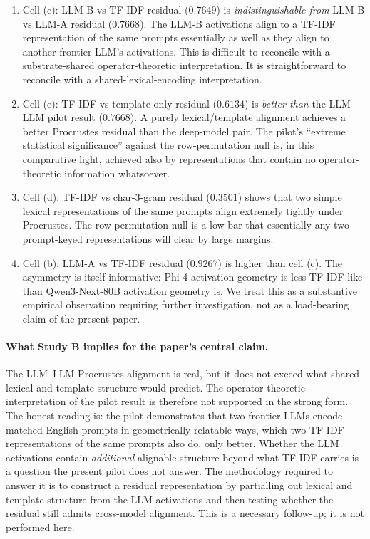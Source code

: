 \begin{enumerate}
    \item Cell (c): LLM-B vs TF-IDF residual ($0.7649$) is
        \emph{indistinguishable from} LLM-B vs LLM-A residual
        ($0.7668$). The LLM-B activations align to a TF-IDF
        representation of the same prompts essentially as well as
        they align to another frontier LLM's activations. This is
        difficult to reconcile with a substrate-shared
        operator-theoretic interpretation. It is straightforward to
        reconcile with a shared-lexical-encoding interpretation.
    \item Cell (e): TF-IDF vs template-only residual ($0.6134$) is
        \emph{better than} the LLM--LLM pilot result ($0.7668$). A
        purely lexical/template alignment achieves a better
        Procrustes residual than the deep-model pair. The pilot's
        ``extreme statistical significance'' against the
        row-permutation null is, in this comparative light, achieved
        also by representations that contain no
        operator-theoretic information whatsoever.
    \item Cell (d): TF-IDF vs char-3-gram residual ($0.3501$) shows
        that two simple lexical representations of the same prompts
        align extremely tightly under Procrustes. The
        row-permutation null is a low bar that essentially any two
        prompt-keyed representations will clear by large margins.
    \item Cell (b): LLM-A vs TF-IDF residual ($0.9267$) is higher than
        cell (c). The asymmetry is itself informative: Phi-4
        activation geometry is less TF-IDF-like than Qwen3-Next-80B
        activation geometry is. We treat this as a substantive
        empirical observation requiring further investigation, not as
        a load-bearing claim of the present paper.
\end{enumerate}

\paragraph{What Study B implies for the paper's central claim.} The
LLM--LLM Procrustes alignment is real, but it does not exceed what
shared lexical and template structure would predict. The operator-theoretic
interpretation of the pilot result is therefore not supported in the
strong form. The honest reading is: the pilot demonstrates that two
frontier LLMs encode matched English prompts in geometrically
relatable ways, which two TF-IDF representations of the same prompts
also do, only better. Whether the LLM activations contain
\emph{additional} alignable structure beyond what TF-IDF carries is a
question the present pilot does not answer. The methodology required
to answer it is to construct a residual representation by partialling
out lexical and template structure from the LLM activations and then
testing whether the residual still admits cross-model alignment.
This is a necessary follow-up; it is not performed here.

